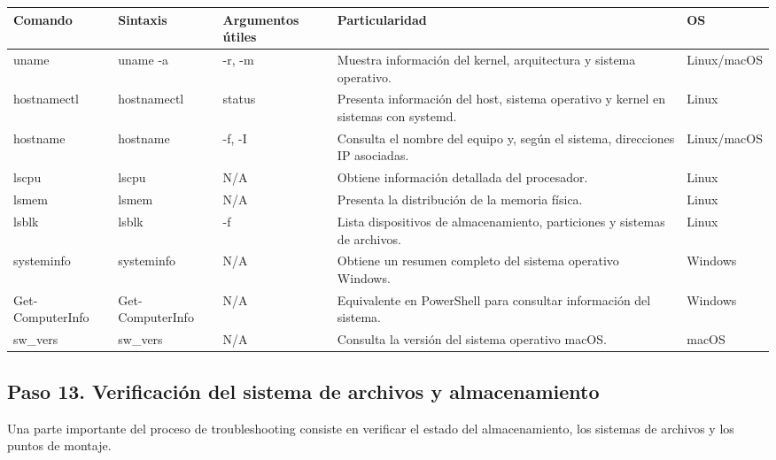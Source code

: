 \documentclass[a4paper,10pt]{article}
\begin{document}
\begin{longtable}{|p{2.8cm}|p{3.2cm}|p{4cm}|p{5.4cm}|p{1.5cm}|}

\hline
Comando &
Sintaxis &
Argumentos útiles &
Particularidad &
OS
\\
\hline
\endhead

uname &
uname -a &
-r, -m &
Muestra información del kernel, arquitectura y sistema operativo. &
Linux/macOS
\\
\hline

hostnamectl &
hostnamectl &
status &
Presenta información del host, sistema operativo y kernel en sistemas con systemd. &
Linux
\\
\hline

hostname &
hostname &
-f, -I &
Consulta el nombre del equipo y, según el sistema, direcciones IP asociadas. &
Linux/macOS
\\
\hline

lscpu &
lscpu &
N/A &
Obtiene información detallada del procesador. &
Linux
\\
\hline

lsmem &
lsmem &
N/A &
Presenta la distribución de la memoria física. &
Linux
\\
\hline

lsblk &
lsblk &
-f &
Lista dispositivos de almacenamiento, particiones y sistemas de archivos. &
Linux
\\
\hline

systeminfo &
systeminfo &
N/A &
Obtiene un resumen completo del sistema operativo Windows. &
Windows
\\
\hline

Get-ComputerInfo &
Get-ComputerInfo &
N/A &
Equivalente en PowerShell para consultar información del sistema. &
Windows
\\
\hline

sw\_vers &
sw\_vers &
N/A &
Consulta la versión del sistema operativo macOS. &
macOS
\\
\hline

\end{longtable}


\subsection{Paso 13. Verificación del sistema de archivos y almacenamiento}

Una parte importante del proceso de troubleshooting consiste en verificar el
estado del almacenamiento, los sistemas de archivos y los puntos de montaje.
\end{document}

